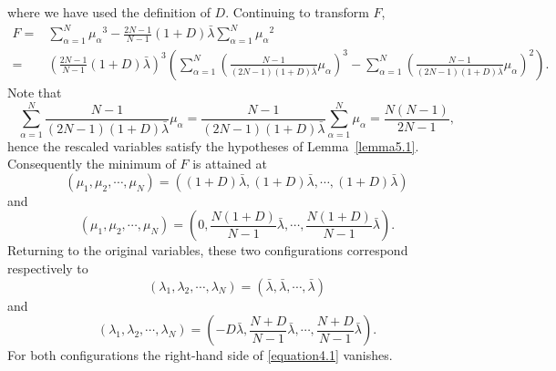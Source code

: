 \documentclass{amsart}
\theoremstyle{definition}
\theoremstyle{remark}
\numberwithin{equation}{section}
\begin{document}
where we have used the definition of $D$. Continuing to transform $F$,
\begin{align*}
F =& \sum\limits_{\alpha  = 1}^N {{\mu _\alpha }^3}  - \frac{{2N - 1}}{{N - 1}}\left( {1 + D} \right)\bar \lambda \sum\limits_{\alpha  = 1}^N {{\mu _\alpha }^2} \\
 =& {\left( {\frac{{2N - 1}}{{N - 1}}\left( {1 + D} \right)\bar \lambda } \right)^3}\left( {\sum\limits_{\alpha  = 1}^N {{{\left( {\frac{{N - 1}}{{\left( {2N - 1} \right)\left( {1 + D} \right)\bar \lambda }}{\mu _\alpha }} \right)}^3}}  - \sum\limits_{\alpha  = 1}^N {{{\left( {\frac{{N - 1}}{{\left( {2N - 1} \right)\left( {1 + D} \right)\bar \lambda }}{\mu _\alpha }} \right)}^2}} } \right).
\end{align*}
Note that $$\sum\limits_{\alpha  = 1}^N {\frac{{N - 1}}{{\left( {2N - 1} \right)\left( {1 + D} \right)\bar \lambda }}{\mu _\alpha }}  = \frac{{N - 1}}{{\left( {2N - 1} \right)\left( {1 + D} \right)\bar \lambda }}\sum\limits_{\alpha  = 1}^N {{\mu _\alpha }}  = \frac{{N\left( {N - 1} \right)}}{{2N - 1}},$$
hence the rescaled variables satisfy the hypotheses of Lemma~\ref{lemma5.1}. Consequently the minimum of $F$ is attained at
$$\left( {{\mu _1},{\mu _2}, \cdots ,{\mu _N}} \right) = \left( {\left( {1 + D} \right)\bar \lambda ,\left( {1 + D} \right)\bar \lambda , \cdots ,\left( {1 + D} \right)\bar \lambda } \right)$$
and
$$\left( {{\mu _1},{\mu _2}, \cdots ,{\mu _N}} \right) = \left( {0,\frac{{N\left( {1 + D} \right)}}{{N - 1}}\bar \lambda , \cdots ,\frac{{N\left( {1 + D} \right)}}{{N - 1}}\bar \lambda } \right).$$Returning to the original variables, these two configurations correspond respectively to
$$\left( {{\lambda _1},{\lambda _2}, \cdots ,{\lambda _N}} \right) = \left( {\bar \lambda ,\bar \lambda , \cdots ,\bar \lambda } \right)$$
and
$$\left( {{\lambda _1},{\lambda _2}, \cdots ,{\lambda _N}} \right) = \left( { - D\bar \lambda ,\frac{{N + D}}{{N - 1}}\bar \lambda , \cdots ,\frac{{N + D}}{{N - 1}}\bar \lambda } \right).$$
For both configurations the right-hand side of \eqref{equation4.1} vanishes.
\end{document}
